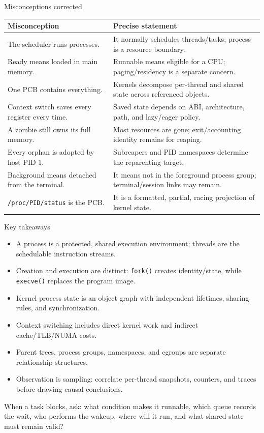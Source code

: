 \documentclass[aspectratio=169,11pt]{beamer}
\newcommand{\code}[1]{\texttt{#1}}
\begin{document}
\begin{frame}{Misconceptions corrected}
  \small
  \begin{tabularx}{\textwidth}{@{}X@{\quad$\Rightarrow$\quad}X@{}}
    \toprule
    \textbf{Misconception} & \textbf{Precise statement} \\
    \midrule
    The scheduler runs processes. & It normally schedules threads/tasks; process is a resource boundary. \\
    Ready means loaded in main memory. & Runnable means eligible for a CPU; paging/residency is a separate concern. \\
    One PCB contains everything. & Kernels decompose per-thread and shared state across referenced objects. \\
    Context switch saves every register every time. & Saved state depends on ABI, architecture, path, and lazy/eager policy. \\
    A zombie still owns its full memory. & Most resources are gone; exit/accounting identity remains for reaping. \\
    Every orphan is adopted by host PID 1. & Subreapers and PID namespaces determine the reparenting target. \\
    Background means detached from the terminal. & It means not in the foreground process group; terminal/session links may remain. \\
    \code{/proc/PID/status} is the PCB. & It is a formatted, partial, racing projection of kernel state. \\
    \bottomrule
  \end{tabularx}
\end{frame}

\begin{frame}{Key takeaways}
  \begin{itemize}
    \item A process is a protected, shared execution environment; threads are the schedulable instruction streams.
    \item Creation and execution are distinct: \code{fork()} creates identity/state, while \code{execve()} replaces the program image.
    \item Kernel process state is an object graph with independent lifetimes, sharing rules, and synchronization.
    \item Context switching includes direct kernel work and indirect cache/TLB/NUMA costs.
    \item Parent trees, process groups, namespaces, and cgroups are separate relationship structures.
    \item Observation is sampling: correlate per-thread snapshots, counters, and traces before drawing causal conclusions.
  \end{itemize}
  \begin{tcolorbox}[title=Transfer question,colback=osgreen!5,colframe=osgreen!65]
    When a task blocks, ask: what condition makes it runnable, which queue records the wait, who performs the wakeup, where will it run, and what shared state must remain valid?
  \end{tcolorbox}
\end{frame}
\end{document}
